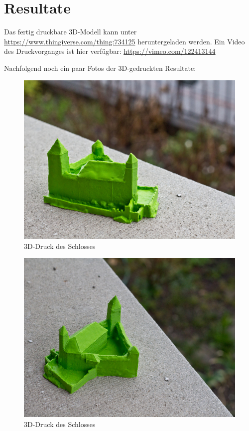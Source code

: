 
\section{Resultate}

Das fertig druckbare 3D-Modell kann unter
\url{https://www.thingiverse.com/thing:734125} heruntergeladen werden. Ein Video
des Druckvorganges ist hier verfügbar: \url{https://vimeo.com/122413144}

Nachfolgend noch ein paar Fotos der 3D-gedruckten Resultate:

\begin{figure}[H]
	\centering
	\includegraphics[width=\textwidth]{images/castle-printed-1}
	\caption{3D-Druck des Schlosses}
	\label{img:castle_printed_1}
\end{figure}

\begin{figure}[H]
	\centering
	\includegraphics[width=\textwidth]{images/castle-printed-2}
	\caption{3D-Druck des Schlosses}
	\label{img:castle_printed_2}
\end{figure}

